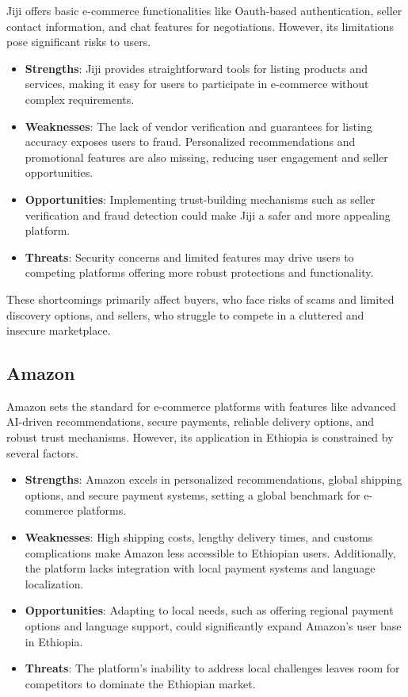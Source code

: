 \documentclass[12pt]{report}
\begin{document}
Jiji offers basic e-commerce functionalities like Oauth-based authentication, seller contact
information, and chat features for negotiations. However, its limitations pose significant risks
to users.

\begin{itemize}
	\item \textbf{Strengths}: Jiji provides straightforward tools for listing products and services,
	      making it easy for users to participate in e-commerce without complex requirements.
	\item \textbf{Weaknesses}: The lack of vendor verification and guarantees for listing accuracy
	      exposes users to fraud. Personalized recommendations and promotional features are
	      also missing, reducing user engagement and seller opportunities.
	\item \textbf{Opportunities}: Implementing trust-building mechanisms such as seller verification
	      and fraud detection could make Jiji a safer and more appealing platform.
	\item \textbf{Threats}: Security concerns and limited features may drive users to competing
	      platforms offering more robust protections and functionality.
\end{itemize}

These shortcomings primarily affect buyers, who face risks of scams and limited discovery
options, and sellers, who struggle to compete in a cluttered and insecure marketplace.

\subsection*{Amazon}

Amazon sets the standard for e-commerce platforms with features like advanced AI-driven
recommendations, secure payments, reliable delivery options, and robust trust mechanisms.
However, its application in Ethiopia is constrained by several factors.

\begin{itemize}
	\item \textbf{Strengths}: Amazon excels in personalized recommendations, global shipping options,
	      and secure payment systems, setting a global benchmark for e-commerce platforms.
	\item \textbf{Weaknesses}: High shipping costs, lengthy delivery times, and customs complications
	      make Amazon less accessible to Ethiopian users. Additionally, the platform lacks
	      integration with local payment systems and language localization.
	\item \textbf{Opportunities}: Adapting to local needs, such as offering regional payment options
	      and language support, could significantly expand Amazon’s user base in Ethiopia.
	\item \textbf{Threats}: The platform’s inability to address local challenges leaves room for
	      competitors to dominate the Ethiopian market.
\end{itemize}
\end{document}
